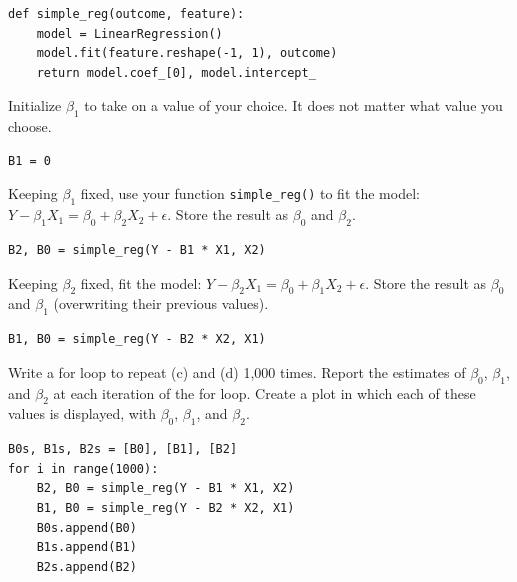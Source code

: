 \documentclass{article}
\begin{document}
\begin{probset}
\begin{prob}
\begin{subprobset}
\begin{subprob}
            \begin{verbatim}
def simple_reg(outcome, feature):
    model = LinearRegression()
    model.fit(feature.reshape(-1, 1), outcome)
    return model.coef_[0], model.intercept_
            \end{verbatim}
        \end{subprob}

        \begin{subprob}
            Initialize $\beta_1$ to take on a value of your choice. It does not matter what value you choose.

            \begin{verbatim}
B1 = 0
            \end{verbatim}
        \end{subprob}

        \begin{subprob}
            Keeping $\beta_1$ fixed, use your function \texttt{simple\_reg()} to fit the model:
            $Y - \beta_1 X_1 = \beta_0 + \beta_2 X_2 + \epsilon$.
            Store the result as $\beta_0$ and $\beta_2$.

            \begin{verbatim}
B2, B0 = simple_reg(Y - B1 * X1, X2)
            \end{verbatim}
        \end{subprob}

        \begin{subprob}
            Keeping $\beta_2$ fixed, fit the model:
            $Y - \beta_2 X_1 = \beta_0 + \beta_1 X_2 + \epsilon$.
            Store the result as $\beta_0$ and $\beta_1$ (overwriting their previous values).

            \begin{verbatim}
B1, B0 = simple_reg(Y - B2 * X2, X1)
            \end{verbatim}
        \end{subprob}

        \newpage

        \begin{subprob}
            Write a for loop to repeat (c) and (d) 1,000 times. Report the estimates of $\beta_0$, $\beta_1$, and $\beta_2$ at each iteration of the for loop. Create a plot in which each of these values is displayed, with $\beta_0$, $\beta_1$, and $\beta_2$.

            \begin{verbatim}
B0s, B1s, B2s = [B0], [B1], [B2]
for i in range(1000):
    B2, B0 = simple_reg(Y - B1 * X1, X2)
    B1, B0 = simple_reg(Y - B2 * X2, X1)
    B0s.append(B0)
    B1s.append(B1)
    B2s.append(B2)


\end{verbatim}
\end{subprob}
\end{subprobset}
\end{prob}
\end{probset}
\end{document}
